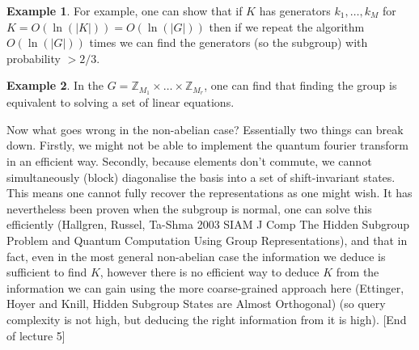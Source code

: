 \documentclass{article}
\theoremstyle{definition}
\newtheorem{example}{Example}
\begin{document}
\begin{example}
  For example, one can show that if $K$ has generators $k_1, \dots, k_M$ for $K
  = O(\ln(|K|)) = O(\ln(|G|))$ then if we repeat the algorithm $O(\ln(|G|))$
  times we can find the generators (so the subgroup) with probability $> 2/3$.
\end{example}

\begin{example}
  In the $G = \mathbb{Z}_{M_1} \times \dots \times \mathbb{Z}_{M_r}$, one can
  find that finding the group is equivalent to solving a set of linear
  equations.
\end{example}

Now what goes wrong in the non-abelian case? Essentially two things can break
down. Firstly, we might not be able to implement the quantum fourier transform
in an efficient way. Secondly, because elements don't commute, we cannot
simultaneously (block) diagonalise the basis into a set of shift-invariant
states. This means one cannot fully recover the representations as one might
wish. It has nevertheless been proven when the subgroup is normal, one can solve
this efficiently (Hallgren, Russel, Ta-Shma 2003 SIAM J Comp The Hidden Subgroup
Problem and Quantum Computation Using Group Representations), and that in fact,
even in the most general non-abelian case the information we deduce is
sufficient to find $K$, however there is no efficient way to deduce $K$ from the
information we can gain using the more coarse-grained approach here (Ettinger,
Hoyer and Knill, Hidden Subgroup States are Almost Orthogonal) (so query
complexity is not high, but deducing the right information from it is high).
[End of lecture 5]
\end{document}
